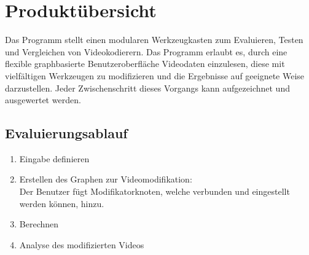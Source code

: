 \section{Produktübersicht}

Das Programm stellt einen modularen Werkzeugkasten zum Evaluieren, Testen und Vergleichen von Videokodierern. Das Programm erlaubt es, durch eine flexible graphbasierte Benutzeroberfläche Videodaten einzulesen, diese mit vielfältigen Werkzeugen zu modifizieren und die Ergebnisse auf geeignete Weise darzustellen. Jeder Zwischenschritt dieses Vorgangs kann aufgezeichnet und ausgewertet werden.

\subsection{Evaluierungsablauf}
\begin{enumerate}
	\item Eingabe definieren
	\item Erstellen des Graphen zur Videomodifikation:\\
	Der Benutzer fügt Modifikatorknoten, welche verbunden und eingestellt werden können, hinzu.
	\item Berechnen
	\item Analyse des modifizierten Videos 
\end{enumerate}